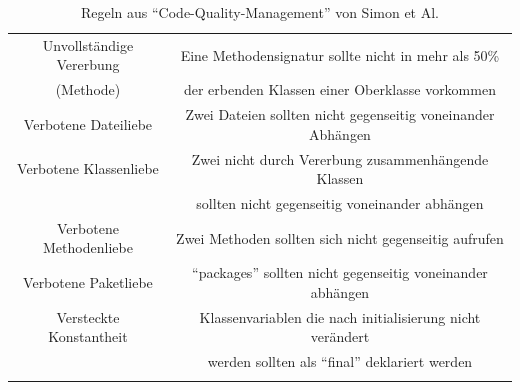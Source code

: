 \documentclass[da,ngerman]{stthesis}
\begin{document}
\begin{center}
\begin{longtabu}{|c|c|}
						\hline
						Unvollständige Vererbung & Eine Methodensignatur sollte nicht in mehr als 50\% \\ (Methode) & der erbenden Klassen einer Oberklasse vorkommen \\
						\hline
						Verbotene Dateiliebe & Zwei Dateien sollten nicht gegenseitig voneinander Abhängen \\
						\hline
						Verbotene Klassenliebe & Zwei nicht durch Vererbung zusammenhängende Klassen \\ & sollten nicht gegenseitig voneinander abhängen \\
						\hline
						Verbotene Methodenliebe & Zwei Methoden sollten sich nicht gegenseitig aufrufen \\
						\hline
						Verbotene Paketliebe & "`packages"' sollten nicht gegenseitig voneinander abhängen \\
						\hline
						Versteckte Konstantheit & Klassenvariablen die nach initialisierung nicht verändert \\ & werden sollten als "`final"' deklariert werden \\
  						\hline
  						\caption{Regeln aus "`Code-Quality-Management"' von Simon et Al. \cite{CodeQualityManagement}}
						\label{indexrules}
  					\end{longtabu}   
  				\end{center}
\end{document}
